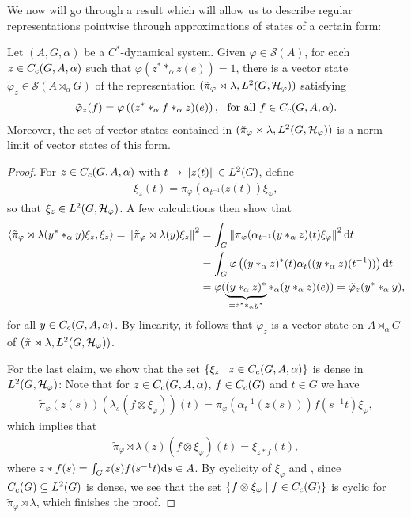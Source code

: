 We now will go through a result which will allow us to describe regular representations pointwise through approximations of states of a certain form:
\begin{proposition}
Let $(A,G,\alpha)$ be a $C^*$-dynamical system. Given $\varphi \in \mathcal{S}(A)$, for each $z \in C_c(G,A,\alpha)$ such that $\varphi(z^* \ast_\alpha z(e)) = 1$, there is a vector state $\tilde \varphi_z \in \mathcal{S}(A \rtimes_\alpha G)$ of the representation $(\tilde \pi_{\varphi} \rtimes \lambda , L^2(G,\mathcal{H}_\varphi))$ satisfying
\begin{align*}
	\tilde \varphi_z (f) =\varphi\left( (z^* \ast_\alpha f \ast_\alpha z)(e) \right), \ \text{ for all } f \in C_c(G,A,\alpha).
\end{align*}
Moreover, the set of vector states contained in $(\tilde \pi_{\varphi} \rtimes \lambda , L^2(G,\mathcal{H}_\varphi))$ is a norm limit of vector states of this form.
\label{mult:vectorstateapprox}
\end{proposition}
\begin{proof}
For $z \in C_c(G,A,\alpha)$ with $t \mapsto \left\lVert z(t) \right\rVert \in L^2(G)$, define
\begin{align*}
	\xi_z(t) = \pi_{\varphi}\left( \alpha_{t^{-1}}(z(t) \right)\xi_\varphi,
\end{align*}
so that $\xi_z \in L^2(G,\mathcal{H}_\varphi)$. A few calculations then show that 
\begin{align*}
	\langle \tilde \pi_\varphi \rtimes \lambda (y^* \ast_\alpha y) \xi_z , \xi_z \rangle  = \left\lVert \tilde \pi_\varphi \rtimes \lambda(y) \xi_z \right\rVert ^2 &= \int_G \left\lVert  \pi_\varphi ( \alpha_{t^{-1}}(y \ast_\alpha z)(t) \xi_\varphi \right\rVert^2 \mathrm{d} t \\
	&=\int_G \varphi\left( (y \ast_\alpha z)^*(t) \alpha_t( (y \ast_\alpha z)( t^{-1}) ) \right) \mathrm{d} t \\
	&= \varphi ( \underbrace{(y  \ast_\alpha z )^*}_{= z^* \ast_\alpha y^*} \ast_\alpha (y \ast_\alpha z) (e)) = \tilde\varphi_{z} (y^* \ast_\alpha y),
\end{align*}
for all $y \in C_c(G,A,\alpha)$. By linearity, it follows that $\tilde \varphi_z$ is a vector state on $A \rtimes_\alpha G$ of $(\tilde \pi \rtimes \lambda, L^2(G,\mathcal{H}_\varphi))$.

For the last claim, we show that the set $\{ \xi_z \mid z \in C_c(G,A,\alpha)\}$ is dense in $L^2(G,\mathcal{H}_\varphi)$: Note that for $z \in C_c(G,A,\alpha)$, $f \in C_c(G)$ and $t \in G$ we have
\begin{align*}
	\tilde \pi_\varphi(z(s)) (\lambda_s (f \otimes \xi_\varphi))(t) = \pi_\varphi(\alpha_t^{-1}(z(s)))f(s^{-1}t) \xi_\varphi,
\end{align*}
which implies that 
\begin{align*}
	\tilde \pi_\varphi \rtimes \lambda (z) (f \otimes \xi_\varphi) (t) = \xi_{z \ast f}(t),
\end{align*}
where $z \ast f(s) = \int_G z(s) f(s^{-1}t) \mathrm{d} s \in A$.  By cyclicity of $\xi_\varphi$ and , since $C_c(G) \subseteq L^2(G)$ is dense, we see that the set $\{ f \otimes \xi_\varphi \mid f \in C_c(G)\}$ is cyclic for $\tilde \pi_\varphi \rtimes \lambda$, which finishes the proof.
\end{proof}


